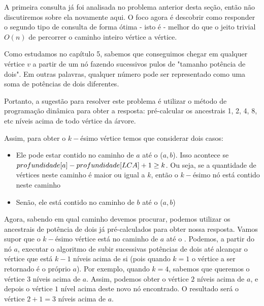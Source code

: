 A primeira consulta já foi analisada no problema anterior desta seção, então não discutiremos sobre ela novamente aqui. O foco agora é descobrir como responder o segundo tipo de consulta de forma ótima - isto é - melhor do que o jeito trivial $O(n)$ de percorrer o caminho inteiro vértice a vértice.

Como estudamos no capítulo 5, sabemos que conseguimos chegar em qualquer vértice $v$ a partir de um nó fazendo sucessivos pulos de "tamanho potência de dois". Em outras palavras, qualquer número pode ser representado como uma soma de potências de dois diferentes.

Portanto, a sugestão para resolver este problema é utilizar o método de programação dinâmica para obter a resposta: pré-calcular os ancestrais 1, 2, 4, 8, etc níveis acima de todo vértice da árvore.

Assim, para obter o $k-$ésimo vértice temos que considerar dois casos:

\begin{itemize}
    \item Ele pode estar contido no caminho de $a$ até o \LCA($a, b$). Isso acontece se $profundidade[a] - profundidade[LCA] + 1 \geq k$. Ou seja, se a quantidade de vértices neste caminho é maior ou igual a $k$, então o $k-$ésimo nó está contido neste caminho
    \item Senão, ele está contido no caminho de $b$ até o \LCA($a, b$)
\end{itemize}

Agora, sabendo em qual caminho devemos procurar, podemos utilizar os ancestrais de potência de dois já pré-calculados para obter nossa resposta. Vamos supor que o $k-$ésimo vértice está no caminho de $a$ até o \LCA. Podemos, a partir do nó $a$, executar o algoritmo de subir sucessivas potências de dois até alcançar o vértice que está $k-1$ níveis acima de si (pois quando $k = 1$ o vértice a ser retornado é o próprio $a$). Por exemplo, quando $k = 4$, sabemos que queremos o vértice $3$ níveis acima de $a$. Assim, podemos obter o vértice $2$ níveis acima de $a$, e depois o vértice $1$ nível acima deste novo nó encontrado. O resultado será o vértice $2 + 1 = 3$ níveis acima de $a$.

\vspace{10cm}

